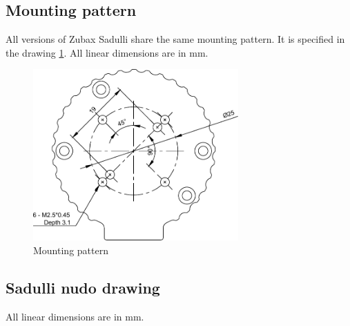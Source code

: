 \subsection{Mounting pattern}

All versions of Zubax Sadulli share the same mounting pattern. 
It is specified in the drawing \ref{fig:characteristics_mounting_pattern}. All linear dimensions are in mm.

\begin{figure}[!hbt]
    \centerline{\includegraphics[width=0.7\textwidth]{figures/mounting_pattern}}
    \caption{Mounting pattern\label{fig:characteristics_mounting_pattern}}
\end{figure}

\newpage

\subsection{Sadulli nudo drawing}
All linear dimensions are in mm.

